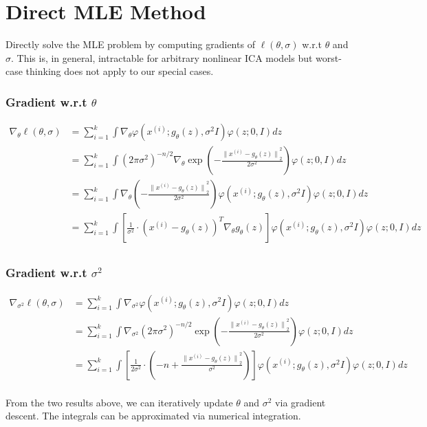 \section{Direct MLE Method}
Directly solve the MLE problem by computing gradients of $\ell(\theta, \sigma)$ w.r.t $\theta$ and $\sigma$. This is, in general, intractable for arbitrary nonlinear ICA models but worst-case thinking does not apply to our special cases.

\subsubsection*{Gradient w.r.t $\theta$}
$$
\begin{aligned}
\nabla_{\theta} \ell(\theta, \sigma) &= \sum_{i=1}^{k} \int \nabla_{\theta} \varphi\left(x^{(i)} ; g_{\theta}(z), \sigma^{2} I\right) \varphi(z ; 0, I) dz \\
&= \sum_{i=1}^{k} \int \left(2\pi\sigma^{2}\right)^{-n/2} \nabla_{\theta} \exp \left(-\frac{{\lVert x^{(i)} - g_{\theta}(z) \rVert}_{2}^{2}}{2\sigma^{2}}\right) \varphi(z ; 0, I) dz \\
&= \sum_{i=1}^{k} \int \nabla_{\theta} \left(-\frac{{\lVert x^{(i)} - g_{\theta}(z) \rVert}_{2}^{2}}{2\sigma^{2}}\right) \varphi\left(x^{(i)} ; g_{\theta}(z), \sigma^{2} I\right) \varphi(z ; 0, I) dz \\
&= \sum_{i=1}^{k} \int \left[\frac{1}{\sigma^{2}} \cdot{\left(x^{(i)} - g_{\theta}(z)\right)^{T} \nabla_{\theta} g_{\theta}(z)}\right] \varphi\left(x^{(i)} ; g_{\theta}(z), \sigma^{2} I\right) \varphi(z ; 0, I) dz \\
\end{aligned}
$$

\subsubsection*{Gradient w.r.t $\sigma^{2}$}
$$
\begin{aligned}
\nabla_{\sigma^{2}} \ell(\theta, \sigma) &= \sum_{i=1}^{k} \int \nabla_{\sigma^{2}} \varphi\left(x^{(i)} ; g_{\theta}(z), \sigma^{2} I\right) \varphi(z ; 0, I) dz \\
&= \sum_{i=1}^{k} \int \nabla_{\sigma^{2}} \left(2\pi\sigma^{2}\right)^{-n/2} \exp \left(-\frac{{\lVert x^{(i)} - g_{\theta}(z) \rVert}_{2}^{2}}{2\sigma^{2}}\right) \varphi(z ; 0, I) dz \\
&= \sum_{i=1}^{k} \int \left[\frac{1}{2\sigma^{2}} \cdot \left(-n + \frac{{\lVert x^{(i)} - g_{\theta}(z) \rVert}_{2}^{2}} {\sigma^{2}}\right)\right] \varphi\left(x^{(i)} ; g_{\theta}(z), \sigma^{2} I\right) \varphi(z ; 0, I) dz \\
\end{aligned}
$$

From the two results above, we can iteratively update $\theta$ and $\sigma^{2}$ via gradient descent. The integrals can be approximated via numerical integration.


